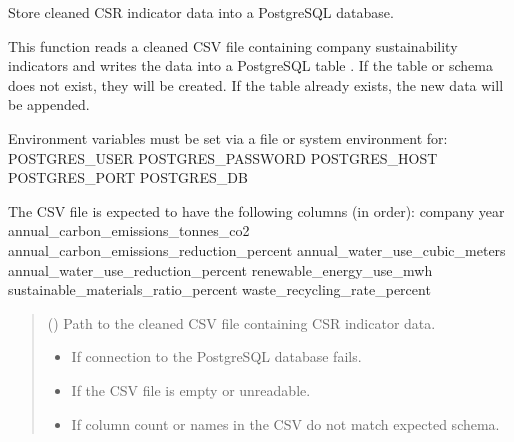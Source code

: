 \documentclass[letterpaper,10pt,english]{sphinxmanual}
\begin{document}
\begin{fulllineitems}
\label{\detokenize{autoapi/modules/db/data_storage/index:modules.db.data_storage.store_clean_data_to_postgres}}
\pysigstartsignatures
\pysiglinewithargsret
{}
{}
{}
\pysigstopsignatures
\sphinxAtStartPar
Store cleaned CSR indicator data into a PostgreSQL database.

\sphinxAtStartPar
This function reads a cleaned CSV file containing company sustainability indicators
and writes the data into a PostgreSQL table .
If the table or schema does not exist, they will be created. If the table already exists,
the new data will be appended.

\sphinxAtStartPar
Environment variables must be set via a  file or system environment for:
\sphinxhyphen{} POSTGRES\_USER
\sphinxhyphen{} POSTGRES\_PASSWORD
\sphinxhyphen{} POSTGRES\_HOST
\sphinxhyphen{} POSTGRES\_PORT
\sphinxhyphen{} POSTGRES\_DB

\sphinxAtStartPar
The CSV file is expected to have the following columns (in order):
\sphinxhyphen{} company
\sphinxhyphen{} year
\sphinxhyphen{} annual\_carbon\_emissions\_tonnes\_co2
\sphinxhyphen{} annual\_carbon\_emissions\_reduction\_percent
\sphinxhyphen{} annual\_water\_use\_cubic\_meters
\sphinxhyphen{} annual\_water\_use\_reduction\_percent
\sphinxhyphen{} renewable\_energy\_use\_mwh
\sphinxhyphen{} sustainable\_materials\_ratio\_percent
\sphinxhyphen{} waste\_recycling\_rate\_percent
\begin{quote}\begin{description}
\sphinxAtStartPar
{} () \textendash{} Path to the cleaned CSV file containing CSR indicator data.

\begin{itemize}
\item {} 
\sphinxAtStartPar
{} \textendash{} If connection to the PostgreSQL database fails.

\item {} 
\sphinxAtStartPar
{} \textendash{} If the CSV file is empty or unreadable.

\item {} 
\sphinxAtStartPar
{} \textendash{} If column count or names in the CSV do not match expected schema.

\end{itemize}

\end{description}\end{quote}

\end{fulllineitems}
\end{document}
